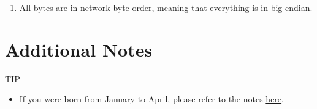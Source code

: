 {\begin{enumerate}
\begin{enumerate}[1.]
\begin{itemize}
                                \item If the symmetric key is not long enough to encrypt the entire message, then it will be applied as a block cipher.



                                \item Meaning that if the key is \textit{n} bits long, it will xor the message in blocks of \textit{n} bits at a time, until it has encrypted the entire message.



                                \item For example, if the symmetric key was 0b11110000, and our message was 8 bytes long, message would be xored by 0b11110000 11110000 11110000 11110000 11110000 11110000 11110000 11110000



                            \end{itemize}



                            \item Finally, the encrypted symmetric key and encrypted message are then both sent to the server.



                        \end{enumerate}



                        \item All bytes are in network byte order, meaning that everything is in big endian.



                    \end{enumerate}







                \section*{Additional Notes}



                    TIP



                    \begin{itemize}



                        \item If you were born from January to April, please refer to the notes \href{https://github.com/brendonky18/Honors-Thesis.CTFs/blob/main/crypto-cracking/notes_0.md}{here}.




\end{itemize}}
